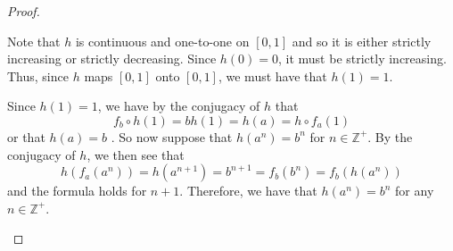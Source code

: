 \begin{proof}
\begin{enumerate}
      Note that $h$ is continuous and one-to-one on $[0, 1]$ and so it is either
      strictly increasing or strictly decreasing. Since $h(0) = 0$, it must be strictly increasing.
      Thus, since $h$ maps $[0,1]$ onto $[0,1]$, we must have that $h(1) = 1$.

      Since $h(1) = 1$, we have by the conjugacy of $h$ that
      $$f_b \circ h(1) = b h(1) = h(a) = h \circ f_a(1)$$
      or that $h(a) = b$ .
      So now suppose that $h(a^n) = b^n$ for $n\in\mathbb{Z}^+$. By the conjugacy of $h$,
      we then see that
      $$h(f_a(a^n)) = h(a^{n+1}) = b^{n+1} = f_b(b^n) = f_b(h(a^n))$$
      and the formula holds for $n+1$.
      Therefore, we have that $h(a^n) = b^n$ for any $n\in \mathbb{Z}^+$.
  \end{enumerate}
\end{proof}
\newpage